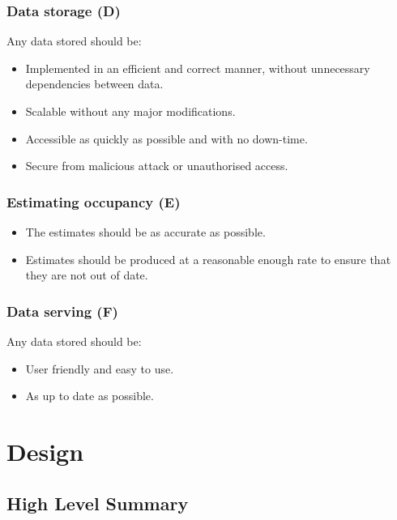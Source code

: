 \documentclass{l4proj}
\begin{document}
\subsection{Data storage (D)}
Any data stored should be:
\begin{itemize}	
  \item Implemented in an efficient and correct manner, without unnecessary dependencies between data.
  \item Scalable without any major modifications.
  \item Accessible as quickly as possible and with no down-time.
  \item Secure from malicious attack or unauthorised access.
\end{itemize}


\subsection{Estimating occupancy (E)}
\begin{itemize}	
  \item The estimates should be as accurate as possible.
  \item Estimates should be produced at a reasonable enough rate to ensure that they are not out of date.
\end{itemize}


\subsection{Data serving (F)}
Any data stored should be:
\begin{itemize}	
  \item User friendly and easy to use.
  \item As up to date as possible.
\end{itemize}


\chapter{Design}
\section{High Level Summary}
\end{document}
